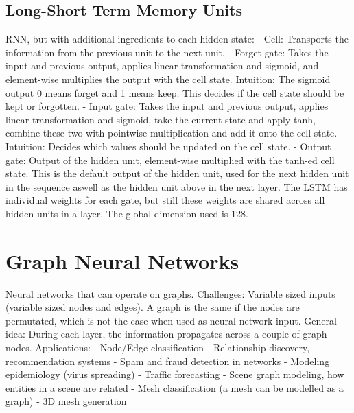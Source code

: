 \documentclass{scrartcl}
\begin{document}
\subsection*{Long-Short Term Memory Units}
RNN, but with additional ingredients to each hidden state:
- Cell: Transports the information from the previous unit to the next unit.
- Forget gate: Takes the input and previous output, applies linear transformation and sigmoid, and element-wise multiplies the output with the cell state. Intuition: The sigmoid output 0 means forget and 1 means keep. This decides if the cell state should be kept or forgotten.
- Input gate: Takes the input and previous output, applies linear transformation and sigmoid, take the current state and apply tanh, combine these two with pointwise multiplication and add it onto the cell state. Intuition: Decides which values should be updated on the cell state.
- Output gate: Output of the hidden unit, element-wise multiplied with the tanh-ed cell state. This is the default output of the hidden unit, used for the next hidden unit in the sequence aswell as the hidden unit above in the next layer. 
The LSTM has individual weights for each gate, but still these weights are shared across all hidden units in a layer. The global dimension used is 128.


\section*{Graph Neural Networks}
Neural networks that can operate on graphs.
Challenges: Variable sized inputs (variable sized nodes and edges). A graph is the same if the nodes are permutated, which is not the case when used as neural network input.
General idea: During each layer, the information propagates across a couple of graph nodes.
Applications:
- Node/Edge classification
- Relationship discovery, recommendation systems
- Spam and fraud detection in networks
- Modeling epidemiology (virus spreading)
- Traffic forecasting
- Scene graph modeling, how entities in a scene are related
- Mesh classification (a mesh can be modelled as a graph)
- 3D mesh generation
\end{document}
